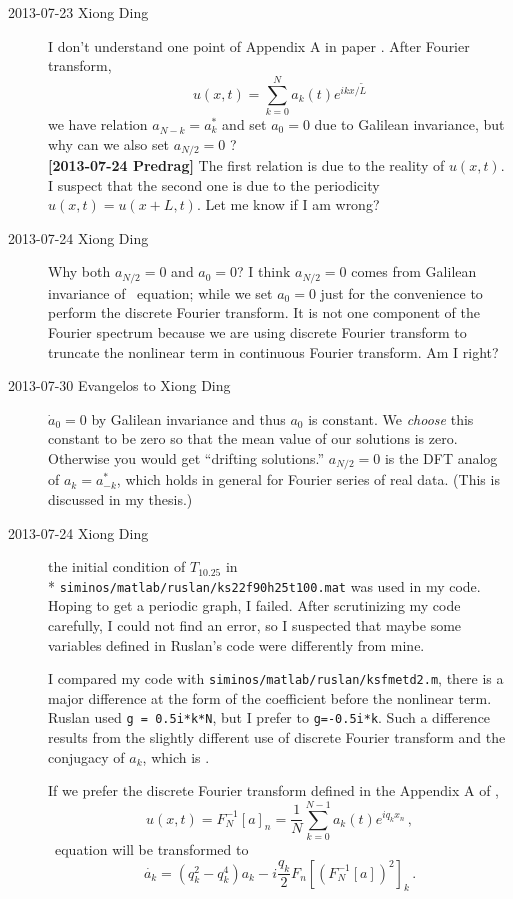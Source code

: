 \begin{description}
\item[2013-07-23 Xiong Ding]
I don't understand one point of Appendix A in paper .
After Fourier transform,
\[
 u(x,t)=\sum_{k=0}^{N} a_{k}(t)e^{ikx/\tilde{L}}
\]
we have relation $a_{N-k}^{~}=a_{k}^{*}$ and set $a_0=0$ due to Galilean
invariance, but why can we also set $a_{N/2}=0$ ?
\\
{\bf [2013-07-24 Predrag]} The first relation is due to the reality of
\( u(x,t) \). I suspect that the second one is due to the periodicity
\( u(x,t) = u(x+L,t) \). Let me know if I am wrong?

\item[2013-07-24  Xiong Ding]
Why both $a_{N/2}=0$ and $a_0=0$? I think $a_{N/2}=0$ comes from Galilean
invariance of \KS\ equation; while we set $a_0=0$ just for the
convenience to perform the discrete Fourier transform. It is not one
component of the Fourier spectrum because we are using discrete Fourier
transform to truncate the nonlinear term in continuous Fourier transform.
Am I right?

\item[2013-07-30 Evangelos to Xiong Ding]
$\dot{a}_0=0$ by Galilean invariance and thus $a_0$ is constant. We \emph{choose} this constant to be zero so that
the mean value of our solutions is zero. Otherwise you would get ``drifting solutions.''
$a_{N/2}=0$ is the DFT analog of $a_k=a^*_{-k}$, which holds in general for Fourier series of real data.
(This is discussed in my thesis.)

\item[2013-07-24  Xiong Ding] the initial condition of $T_{10.25}$ in
\\*
\texttt{siminos/matlab/ruslan/ks22f90h25t100.mat}
was used in my code. Hoping to get a
periodic graph, I failed. After scrutinizing my code carefully,
I could not find an error, so I suspected that maybe some variables
defined in Ruslan's code were differently
from mine.

I compared my code with \texttt{siminos/matlab/ruslan/ksfmetd2.m},
there is a major difference at the form of the coefficient before the nonlinear term.
Ruslan used \texttt{g = 0.5i*k*N}, but I prefer to \texttt{g=-0.5i*k}.
Such a difference results from the slightly different use of discrete Fourier transform
and the conjugacy of $a_k$, which is .

If we prefer the discrete Fourier transform defined in the Appendix A of
,
\[
 u(x,t)=F_N^{-1}[a]_n=\frac{1}{N}\sum_{k=0}^{N-1} a_{k}(t)e^{iq_{k}x_{n}}
\,,
\]
\KS\ equation will be transformed to
\[
 \dot{a_k}=(q_{k}^2-q_k^4)a_k-i\frac{q_k}{2}F_{n}[(F_N^{-1}[a])^2]_k
\,.
\]


\end{description}
